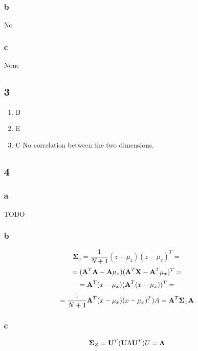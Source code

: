 \documentclass{article}
\begin{document}
\subsubsection{b}
No
\subsubsection{c}
None

\subsection{3}
\begin{enumerate}
  \item B
  \item E
  \item C No correlation between the two dimensions.
\end{enumerate}

\subsection{4}
\subsubsection{a}
TODO
\subsubsection{b}
$$\boldsymbol\Sigma_z = \frac{1}{N+1} (z - \mu_z)(z - \mu_z)^T = $$
$$= (\textbf A^T\textbf A - \textbf A\mu_x)(\textbf A^T\textbf X - \textbf A^T\mu_x)^T = $$
$$= \textbf A^T(x - \mu_x)(\textbf A^T(x - \mu_x))^T = $$
$$= \frac{1}{N+1}\textbf A^T(x - \mu_x)(x - \mu_x)^T)A = \textbf A^T\boldsymbol\Sigma_x\textbf A$$
\subsubsection{c}
$$\boldsymbol\Sigma_Z = \textbf U^T(\textbf U\Lambda\textbf U^T)U = \boldsymbol\Lambda$$
\end{document}
